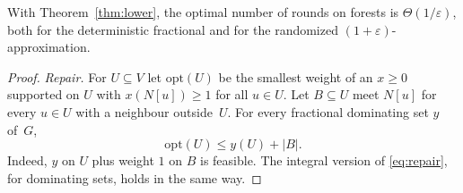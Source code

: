 \documentclass[11pt]{article}
\theoremstyle{remark}
\begin{document}
With Theorem~\ref{thm:lower}, the optimal number of rounds on forests is $\Theta(1/\varepsilon)$,
both for the deterministic fractional and for the randomized $(1+\varepsilon)$-approximation.

\begin{proof}
\emph{Repair.} For $U\subseteq V$ let $\mathrm{opt}(U)$ be the smallest weight of an $x\ge0$
supported on $U$ with $x(N[u])\ge1$ for all $u\in U$. Let $B\subseteq U$ meet $N[u]$ for every
$u\in U$ with a neighbour outside~$U$. For every fractional dominating set $y$ of~$G$,
\begin{equation}\label{eq:repair}
\mathrm{opt}(U)\le y(U)+|B|.
\end{equation}
Indeed, $y$ on $U$ plus weight $1$ on $B$ is feasible. The integral version of \eqref{eq:repair}, for
dominating sets, holds in the same way.


\end{proof}
\end{document}

